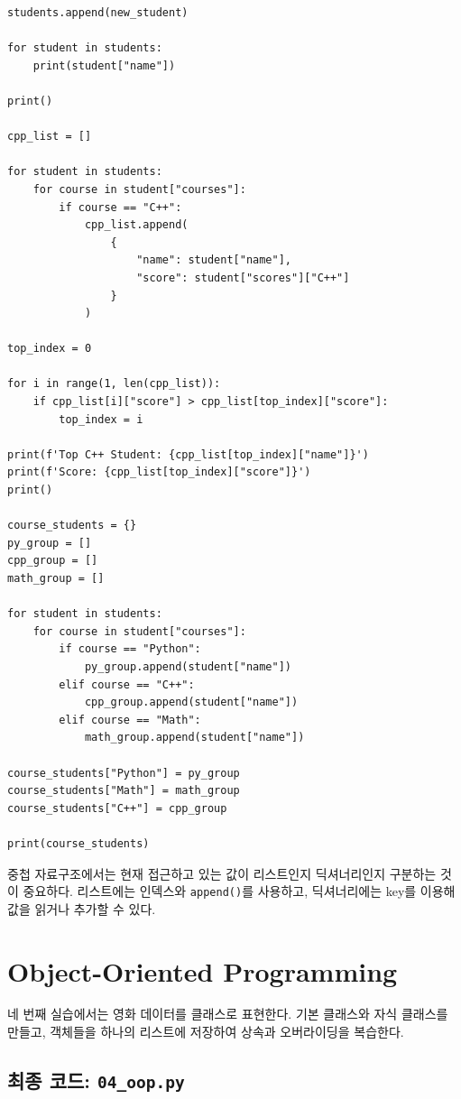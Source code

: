 \documentclass[11pt,a4paper]{article}
\begin{document}
\begin{lstlisting}
students.append(new_student)

for student in students:
    print(student["name"])

print()

cpp_list = []

for student in students:
    for course in student["courses"]:
        if course == "C++":
            cpp_list.append(
                {
                    "name": student["name"],
                    "score": student["scores"]["C++"]
                }
            )

top_index = 0

for i in range(1, len(cpp_list)):
    if cpp_list[i]["score"] > cpp_list[top_index]["score"]:
        top_index = i

print(f'Top C++ Student: {cpp_list[top_index]["name"]}')
print(f'Score: {cpp_list[top_index]["score"]}')
print()

course_students = {}
py_group = []
cpp_group = []
math_group = []

for student in students:
    for course in student["courses"]:
        if course == "Python":
            py_group.append(student["name"])
        elif course == "C++":
            cpp_group.append(student["name"])
        elif course == "Math":
            math_group.append(student["name"])

course_students["Python"] = py_group
course_students["Math"] = math_group
course_students["C++"] = cpp_group

print(course_students)
\end{lstlisting}

\begin{importantbox}
중첩 자료구조에서는 현재 접근하고 있는 값이 리스트인지 딕셔너리인지 구분하는 것이 중요하다.
리스트에는 인덱스와 \texttt{append()}를 사용하고, 딕셔너리에는 key를 이용해 값을 읽거나 추가할 수 있다.
\end{importantbox}

\section{Object-Oriented Programming}

네 번째 실습에서는 영화 데이터를 클래스로 표현한다.
기본 클래스와 자식 클래스를 만들고, 객체들을 하나의 리스트에 저장하여 상속과 오버라이딩을 복습한다.

\subsection{최종 코드: \texttt{04\_oop.py}}
\end{document}
